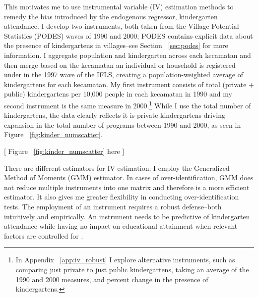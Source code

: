 This motivates me to use instrumental variable (IV) estimation methods to remedy the bias introduced by the endogenous regressor, kindergarten attendance. I develop two instruments, both taken from the Village Potential Statistics (PODES) waves of 1990 and 2000; PODES contains explicit data about the presence of kindergartens in villages--see Section ~\ref{sec:podes} for more information. I aggregate population and kindergarten across each kecamatan and then merge based on the kecamatan an individual or household is registered under in the 1997 wave of the IFLS, creating a population-weighted average of kindergartens for each kecamatan. My first instrument consists of total (private + public) kindergartens per 10,000 people in each kecamatan in 1990 and my second instrument is the same measure in 2000.\footnote{In Appendix ~\ref{app:iv_robust} I explore alternative instruments, such as comparing just private to just public kindergartens, taking an average of the 1990 and 2000 measures, and percent change in the presence of kindergartens.} While I use the total number of kindergartens, the data clearly reflects it is private kindergartens driving expansion in the total number of programs between 1990 and 2000, as seen in Figure ~\ref{fig:kinder_numscatter}.
\begin{center}
	[ Figure ~\ref{fig:kinder_numscatter} here ]
\end{center}
There are different estimators for IV estimation; I employ the Generalized Method of Moments (GMM) estimator. In cases of over-identification, GMM does not reduce multiple instruments into one matrix and therefore is a more efficient estimator. It also gives me greater flexibility in conducting over-identification tests. The employment of an instrument requires a robust defense--both intuitively and empirically. An instrument needs to be predictive of kindergarten attendance while having no impact on educational attainment when relevant factors are controlled for \citep{Levitt2002}.

